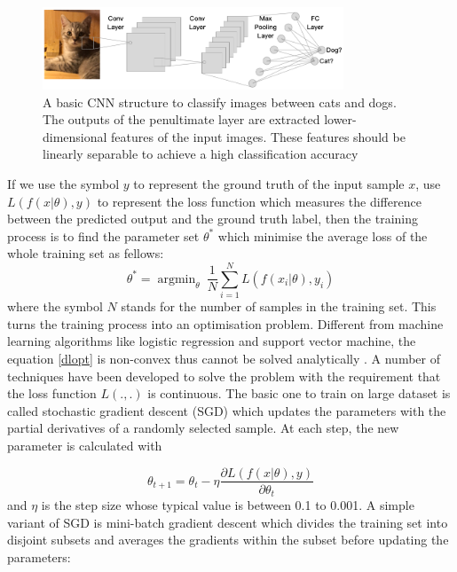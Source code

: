  \begin{figure}[H]
 \centering
 \includegraphics[width=0.8\textwidth]{src/CNN.png}
 \caption{A basic CNN structure to classify images between cats and dogs. The outputs of the penultimate layer are extracted lower-dimensional features of the input images. These features should be linearly separable to achieve a high classification accuracy}
 \label{Fig.CNN}
 \end{figure}

If we use the symbol $y$ to represent the ground truth of the input sample $x$, use $L(f(x|\theta), y)$ to represent the loss function which measures the difference between the predicted output and the ground truth label, then the training process is to find the parameter set $\theta^*$ which minimise the average loss of the whole training set as fellows:
\begin{equation}
\label{dlopt}
\theta^* = \mathop{\arg\min}_{\theta}\ \frac{1}{N}\sum^{N}_{i=1}L(f(x_i|\theta), y_i)
\end{equation}
where the symbol $N$ stands for the number of samples in the training set. This turns the training process into an optimisation problem. Different from machine learning algorithms like logistic regression and support vector machine, the equation \ref{dlopt} is non-convex thus cannot be solved analytically \cite[p.~304]{Courville2016}. A number of techniques have been developed to solve the problem with the requirement that the loss function $L(.,.)$ is continuous. The basic one to train on large dataset is called stochastic gradient descent (SGD) which updates the parameters with the partial derivatives of a randomly selected sample. At each step, the new parameter is calculated with 

\begin{equation}
	\theta_{t+1} = \theta_t - \eta
 \frac{\partial{L(f(x|\theta), y)}}{\partial{\theta_t}}
\end{equation}
and $\eta$ is the step size whose typical value is between 0.1 to 0.001. A simple variant of SGD is mini-batch gradient descent which divides the training set into disjoint subsets and averages the gradients within the subset before updating the parameters:

